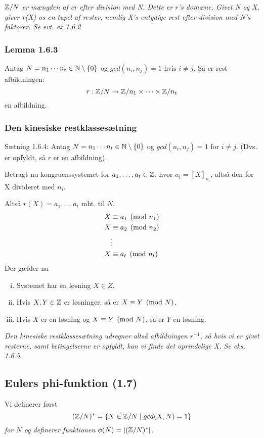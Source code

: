 \textit{$\mathbb{Z} / N$ er mængden af er efter division med N.
Dette er $r$'s domæne. Givet N og X, giver r(X) os en tupel af rester, nemlig
X's entydige rest efter division med N's faktorer. Se evt. ex 1.6.2}

\subsubsection{Lemma 1.6.3}
\label{1.6.3}
Antag $N = n_1 \cdots n_t \in \mathbb{N}\setminus \{0\}$ og $gcd(n_i, n_j) = 1$ hvis
$i \neq j$. Så er rest-afbildningen:
\begin{equation*}
  r: \mathbb{Z}/N \rightarrow \mathbb{Z}/n_1 \times \cdots \times \mathbb{Z}/n_t
\end{equation*}
en  afbildning.

\subsubsection{Den kinesiske restklassesætning}
Sætning 1.6.4: Antag $N = n_1 \cdots n_t \in \mathbb{N}\setminus \{0\}$ og $gcd(n_i,
n_j) = 1$ for $i \neq j$. (Dvs.  er opfyldt, så $r$ er en
 afbildning).

Betragt nu kongruenssystemet for $a_1, \ldots, a_t \in \mathbb{Z}$, hvor $a_i =
[X]_{n_i}$, altså den  for X divideret med $n_i$.

Altså $r(X) = a_1, \ldots, a_t$ mht. til $N$.
\begin{align*}
  X &\equiv a_1 \pmod{n_1}\\
  X &\equiv a_2 \pmod{n_2}\\
  &\vdots\\
  X &\equiv a_t \pmod{n_t}
\end{align*}
Der gælder nu

\begin{enumerate}[(i)]
  \item Systemet har en løsning $X \in Z$.
  \item Hvis $X, Y \in \mathbb{Z}$ er løsninger, så er $X \equiv Y \pmod{N}$.
  \item Hvis $X$ er en løsning og $X \equiv Y \pmod{N}$, så er $Y$ en løsning.
\end{enumerate}
\textit{Den kinesiske restklassesætning udregner altså afbildningen $r^{-1}$,
så hvis vi er givet resterne, samt betingelserne er opfyldt, kan vi finde det
oprindelige X. Se eks. 1.6.5}.


\subsection{Eulers phi-funktion (1.7)}
Vi definerer først
\[
(\mathbb{Z}/ N)^* = \{  X \in \mathbb{Z} / N \mid gcd(X, N) = 1 \}
\]
\textit{for $N$ og definerer funktionen $\phi (N) = |(\mathbb{Z}/N)^*|$.}

